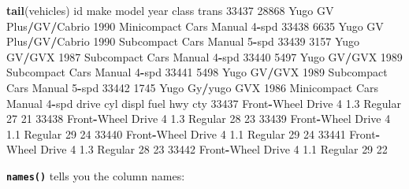 \documentclass[
]{book}
\newenvironment{Shaded}{\begin{snugshade}}{\end{snugshade}}
\newcommand{\DecValTok}[1]{\textcolor[rgb]{0.00,0.00,0.81}{#1}}
\newcommand{\FloatTok}[1]{\textcolor[rgb]{0.00,0.00,0.81}{#1}}
\newcommand{\FunctionTok}[1]{\textcolor[rgb]{0.13,0.29,0.53}{\textbf{#1}}}
\newcommand{\NormalTok}[1]{#1}
\newcommand{\SpecialCharTok}[1]{\textcolor[rgb]{0.81,0.36,0.00}{\textbf{#1}}}
\begin{document}
\begin{Shaded}
\begin{Highlighting}[]
\FunctionTok{tail}\NormalTok{(vehicles) }
\NormalTok{         id make             model year            class        trans}
\DecValTok{33437} \DecValTok{28868}\NormalTok{ Yugo GV Plus}\SpecialCharTok{/}\NormalTok{GV}\SpecialCharTok{/}\NormalTok{Cabrio }\DecValTok{1990}\NormalTok{ Minicompact Cars Manual }\DecValTok{4}\SpecialCharTok{{-}}\NormalTok{spd}
\DecValTok{33438}  \DecValTok{6635}\NormalTok{ Yugo GV Plus}\SpecialCharTok{/}\NormalTok{GV}\SpecialCharTok{/}\NormalTok{Cabrio }\DecValTok{1990}\NormalTok{  Subcompact Cars Manual }\DecValTok{5}\SpecialCharTok{{-}}\NormalTok{spd}
\DecValTok{33439}  \DecValTok{3157}\NormalTok{ Yugo            GV}\SpecialCharTok{/}\NormalTok{GVX }\DecValTok{1987}\NormalTok{  Subcompact Cars Manual }\DecValTok{4}\SpecialCharTok{{-}}\NormalTok{spd}
\DecValTok{33440}  \DecValTok{5497}\NormalTok{ Yugo            GV}\SpecialCharTok{/}\NormalTok{GVX }\DecValTok{1989}\NormalTok{  Subcompact Cars Manual }\DecValTok{4}\SpecialCharTok{{-}}\NormalTok{spd}
\DecValTok{33441}  \DecValTok{5498}\NormalTok{ Yugo            GV}\SpecialCharTok{/}\NormalTok{GVX }\DecValTok{1989}\NormalTok{  Subcompact Cars Manual }\DecValTok{5}\SpecialCharTok{{-}}\NormalTok{spd}
\DecValTok{33442}  \DecValTok{1745}\NormalTok{ Yugo       Gy}\SpecialCharTok{/}\NormalTok{yugo GVX }\DecValTok{1986}\NormalTok{ Minicompact Cars Manual }\DecValTok{4}\SpecialCharTok{{-}}\NormalTok{spd}
\NormalTok{                  drive cyl displ    fuel hwy cty}
\DecValTok{33437}\NormalTok{ Front}\SpecialCharTok{{-}}\NormalTok{Wheel Drive   }\DecValTok{4}   \FloatTok{1.3}\NormalTok{ Regular  }\DecValTok{27}  \DecValTok{21}
\DecValTok{33438}\NormalTok{ Front}\SpecialCharTok{{-}}\NormalTok{Wheel Drive   }\DecValTok{4}   \FloatTok{1.3}\NormalTok{ Regular  }\DecValTok{28}  \DecValTok{23}
\DecValTok{33439}\NormalTok{ Front}\SpecialCharTok{{-}}\NormalTok{Wheel Drive   }\DecValTok{4}   \FloatTok{1.1}\NormalTok{ Regular  }\DecValTok{29}  \DecValTok{24}
\DecValTok{33440}\NormalTok{ Front}\SpecialCharTok{{-}}\NormalTok{Wheel Drive   }\DecValTok{4}   \FloatTok{1.1}\NormalTok{ Regular  }\DecValTok{29}  \DecValTok{24}
\DecValTok{33441}\NormalTok{ Front}\SpecialCharTok{{-}}\NormalTok{Wheel Drive   }\DecValTok{4}   \FloatTok{1.3}\NormalTok{ Regular  }\DecValTok{28}  \DecValTok{23}
\DecValTok{33442}\NormalTok{ Front}\SpecialCharTok{{-}}\NormalTok{Wheel Drive   }\DecValTok{4}   \FloatTok{1.1}\NormalTok{ Regular  }\DecValTok{29}  \DecValTok{22}
\end{Highlighting}
\end{Shaded}

\textbf{\texttt{names()}} tells you the column names:
\end{document}
